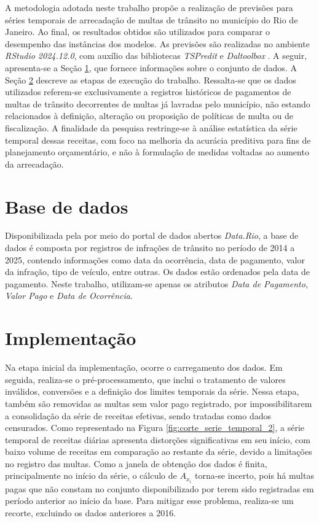 \documentclass[12pt]{tcc}
\begin{document}
A metodologia adotada neste trabalho propõe a realização de previsões para séries temporais de arrecadação de multas de trânsito no município do Rio de Janeiro. Ao final, os resultados obtidos são utilizados para comparar o desempenho das instâncias dos modelos. As previsões são realizadas no ambiente \textit{RStudio 2024.12.0}, com auxílio das bibliotecas \textit{TSPredit} e \textit{Daltoolbox} \citep{ogasawara_tspredit_2025, daltoolbox}. A seguir, apresenta-se a Seção \ref{sec:base_de_dados}, que fornece informações sobre o conjunto de dados. A Seção \ref{sec:implementacao} descreve as etapas de execução do trabalho. Ressalta-se que os dados utilizados referem-se exclusivamente a registros históricos de pagamentos de multas de trânsito decorrentes de multas já lavradas pelo município, não estando relacionados à definição, alteração ou proposição de políticas de multa ou de fiscalização. A finalidade da pesquisa restringe-se à análise estatística da série temporal dessas receitas, com foco na melhoria da acurácia preditiva para fins de planejamento orçamentário, e não à formulação de medidas voltadas ao aumento da arrecadação.

\section{Base de dados} 
\label{sec:base_de_dados}

Disponibilizada pela \cite{dataRioSMTR} por meio do portal de dados abertos 
\textit{Data.Rio}, a base de dados é composta por registros de infrações de trânsito no período de 2014 a 2025, contendo informações como data da ocorrência, data de pagamento, valor da infração, tipo de veículo, entre outras. Os dados estão ordenados pela data de pagamento. Neste trabalho, utilizam-se apenas os atributos \textit{Data de Pagamento}, \textit{Valor Pago} e \textit{Data de Ocorrência}.

\section{Implementação}
\label{sec:implementacao}

Na etapa inicial da implementação, ocorre o carregamento dos dados. Em seguida, realiza-se o pré-processamento, que inclui o tratamento de valores inválidos, conversões e a definição dos limites temporais da série. Nessa etapa, também são removidas as multas sem valor pago registrado, por impossibilitarem a consolidação da série de receitas efetivas, sendo tratadas como dados censurados. Como representado na Figura \ref{fig:corte_serie_temporal_2}, a série temporal de receitas diárias apresenta distorções significativas em seu início, com baixo volume de receitas em comparação ao restante da série, devido a limitações no registro das multas. Como a janela de obtenção dos dados é finita, principalmente no início da série, o cálculo de $A_{x_i}$ torna-se incerto, pois há multas pagas que não constam no conjunto disponibilizado por terem sido registradas em período anterior ao início da base. Para mitigar esse problema, realiza-se um recorte, excluindo os dados anteriores a 2016. 
\end{document}
